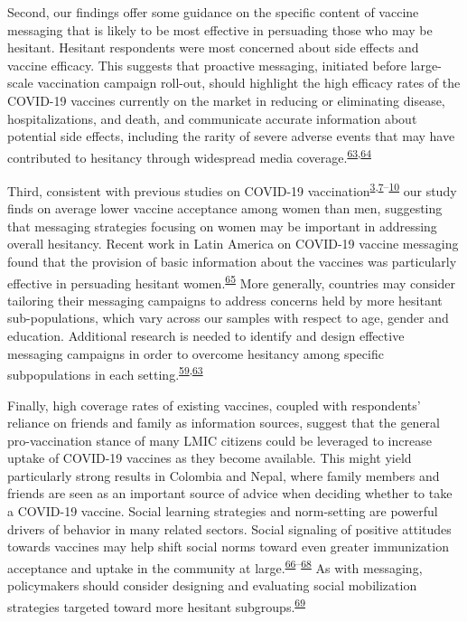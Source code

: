 \documentclass[
  12pt,
]{article}
\begin{document}
Second, our findings offer some guidance on the specific content of vaccine messaging that is likely to be most effective in persuading those who may be hesitant. Hesitant respondents were most concerned about side effects and vaccine efficacy. This suggests that proactive messaging, initiated before large-scale vaccination campaign roll-out, should highlight the high efficacy rates of the COVID-19 vaccines currently on the market in reducing or eliminating disease, hospitalizations, and death, and communicate accurate information about potential side effects, including the rarity of severe adverse events that may have contributed to hesitancy through widespread media coverage.\textsuperscript{\protect\hyperlink{ref-goldstein2015health}{63},\protect\hyperlink{ref-puri2020social}{64}}

Third, consistent with previous studies on COVID-19 vaccination\textsuperscript{\protect\hyperlink{ref-wouters2021challenges}{3},\protect\hyperlink{ref-kreps2020factors}{7}--\protect\hyperlink{ref-fisher2020attitudes}{10}} our study finds on average lower vaccine acceptance among women than men, suggesting that messaging strategies focusing on women may be important in addressing overall hesitancy. Recent work in Latin America on COVID-19 vaccine messaging found that the provision of basic information about the vaccines was particularly effective in persuading hesitant women.\textsuperscript{\protect\hyperlink{ref-argote2021messaging}{65}} More generally, countries may consider tailoring their messaging campaigns to address concerns held by more hesitant sub-populations, which vary across our samples with respect to age, gender and education. Additional research is needed to identify and design effective messaging campaigns in order to overcome hesitancy among specific subpopulations in each setting.\textsuperscript{\protect\hyperlink{ref-dube2015strategies}{59},\protect\hyperlink{ref-goldstein2015health}{63}}

Finally, high coverage rates of existing vaccines, coupled with respondents' reliance on friends and family as information sources, suggest that the general pro-vaccination stance of many LMIC citizens could be leveraged to increase uptake of COVID-19 vaccines as they become available. This might yield particularly strong results in Colombia and Nepal, where family members and friends are seen as an important source of advice when deciding whether to take a COVID-19 vaccine. Social learning strategies and norm-setting are powerful drivers of behavior in many related sectors. Social signaling of positive attitudes towards vaccines may help shift social norms toward even greater immunization acceptance and uptake in the community at large.\textsuperscript{\protect\hyperlink{ref-van2020using}{66}--\protect\hyperlink{ref-ashraf2014no}{68}} As with messaging, policymakers should consider designing and evaluating social mobilization strategies targeted toward more hesitant subgroups.\textsuperscript{\protect\hyperlink{ref-jalloh2020mobilize}{69}}
\end{document}
